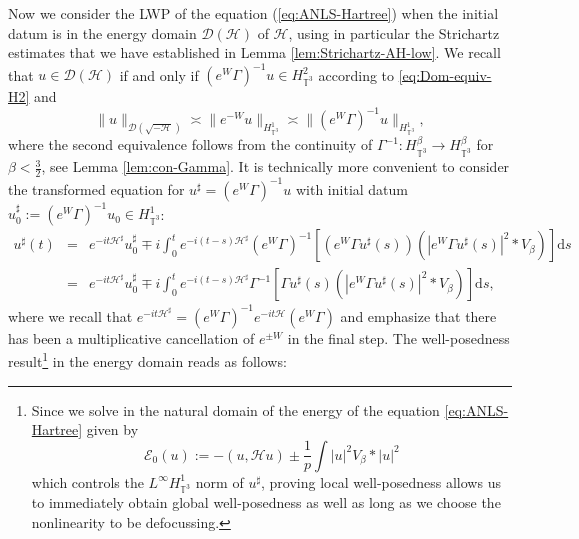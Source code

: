 Now we consider the LWP of the equation (\ref{eq:ANLS-Hartree}) when the
initial datum is in the energy domain $\mathcal{D} (\mathcal{H})$ of
$\mathcal{H}$, using in particular the Strichartz estimates that we have
established in Lemma \ref{lem:Strichartz-AH-low}. We recall that $u \in
\mathcal{D} (\mathcal{H})$ if and only if $(e^W \Gamma)^{- 1} u \in
H_{\mathbb{T}^3}^2$ according to \eqref{eq:Dom-equiv-H2} and
\begin{equation}
  \| u \|_{\mathcal{D} \left( \sqrt{- \mathcal{H}} \right)} \asymp \| e^{- W}
  u \|_{H_{\mathbb{T}^3}^1} \asymp \| (e^W \Gamma)^{- 1} u
  \|_{H_{\mathbb{T}^3}^1},
\end{equation}
where the second equivalence follows from the continuity of $\Gamma^{- 1} :
H_{\mathbb{T}^3}^{\beta} \rightarrow H_{\mathbb{T}^3}^{\beta}$ for $\beta < \frac{3}{2}$, see Lemma \ref{lem:con-Gamma}. It is technically more convenient to
consider the transformed equation for $u^{\sharp} = (e^W \Gamma)^{- 1} u$ with
initial datum $u_0^{\sharp} := (e^W \Gamma)^{- 1} u_0 \in
H_{\mathbb{T}^3}^1$:
\begin{eqnarray}
  u^{\sharp} (t) & = & e^{- i t \mathcal{H}^{\sharp}} u_0^{\sharp} \mp i
  \int^t_0 e^{- i (t - s) \mathcal{H}^{\sharp}} (e^W \Gamma)^{- 1} [(e^W
  \Gamma u^{\sharp} (s)) (| e^W \Gamma u^{\sharp} (s) |^2 \ast V_{\beta})]
  \mathrm{d} s \nonumber\\
  & = & e^{- i t \mathcal{H}^{\sharp}} u_0^{\sharp} \mp i \int^t_0 e^{- i (t
  - s) \mathcal{H}^{\sharp}} \Gamma^{- 1} [\Gamma u^{\sharp} (s) (| e^W \Gamma
  u^{\sharp} (s) |^2 \ast V_{\beta})] \mathrm{d} s,  \label{eq:Duhamel-Hartree}
\end{eqnarray}
where we recall that $e^{- i t \mathcal{H}^{\sharp}} = (e^W \Gamma)^{- 1} e^{-
i t \mathcal{H}} (e^W \Gamma)$ and emphasize that there has been a
multiplicative cancellation of $e^{\pm W}$ in the final step. The well-posedness result\footnote{Since we solve in the natural domain of the energy of the equation
  \eqref{eq:ANLS-Hartree} given by
  \[ \mathcal{E}_0 (u) := - (u, \mathcal{H} u) \pm \frac{1}{p} \int | u
     |^2 V_{\beta} \ast | u |^2 \]
  which controls the $L^{\infty} H_{\mathbb{T}^3}^1$ norm of $u^{\sharp}$,
  proving local well-posedness allows us to immediately obtain global
  well-posedness as well as long as we choose the nonlinearity to be defocussing. } in the energy domain reads as follows:

